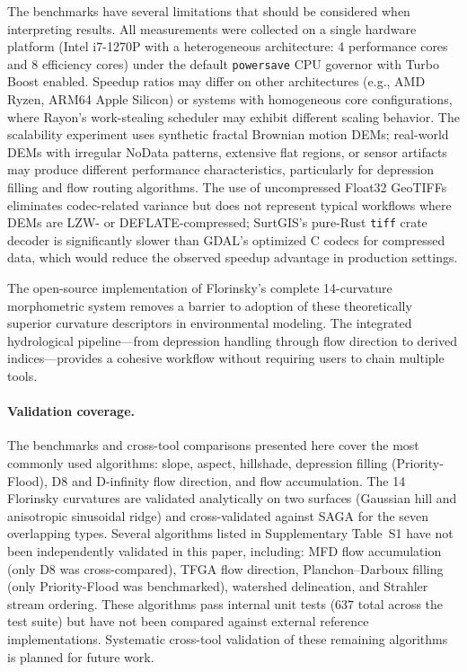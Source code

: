 \documentclass[preprint,review,12pt,authoryear]{elsarticle}
\begin{document}
The benchmarks have several limitations that should be considered when interpreting results. All measurements were collected on a single hardware platform (Intel i7-1270P with a heterogeneous architecture: 4 performance cores and 8 efficiency cores) under the default \texttt{powersave} CPU governor with Turbo Boost enabled. Speedup ratios may differ on other architectures (e.g., AMD Ryzen, ARM64 Apple Silicon) or systems with homogeneous core configurations, where Rayon's work-stealing scheduler may exhibit different scaling behavior. The scalability experiment uses synthetic fractal Brownian motion DEMs; real-world DEMs with irregular NoData patterns, extensive flat regions, or sensor artifacts may produce different performance characteristics, particularly for depression filling and flow routing algorithms. The use of uncompressed Float32 GeoTIFFs eliminates codec-related variance but does not represent typical workflows where DEMs are LZW- or DEFLATE-compressed; SurtGIS's pure-Rust \texttt{tiff} crate decoder is significantly slower than GDAL's optimized C codecs for compressed data, which would reduce the observed speedup advantage in production settings.

The open-source implementation of Florinsky's complete 14-curvature morphometric system \citep{florinsky2025} removes a barrier to adoption of these theoretically superior curvature descriptors in environmental modeling. The integrated hydrological pipeline---from depression handling through flow direction to derived indices---provides a cohesive workflow without requiring users to chain multiple tools.

\paragraph{Validation coverage.} The benchmarks and cross-tool comparisons presented here cover the most commonly used algorithms: slope, aspect, hillshade, depression filling (Priority-Flood), D8 and D-infinity flow direction, and flow accumulation. The 14 Florinsky curvatures are validated analytically on two surfaces (Gaussian hill and anisotropic sinusoidal ridge) and cross-validated against SAGA for the seven overlapping types. Several algorithms listed in Supplementary Table~S1 have not been independently validated in this paper, including: MFD flow accumulation (only D8 was cross-compared), TFGA flow direction, Planchon--Darboux filling (only Priority-Flood was benchmarked), watershed delineation, and Strahler stream ordering. These algorithms pass internal unit tests (637 total across the test suite) but have not been compared against external reference implementations. Systematic cross-tool validation of these remaining algorithms is planned for future work.
\end{document}
